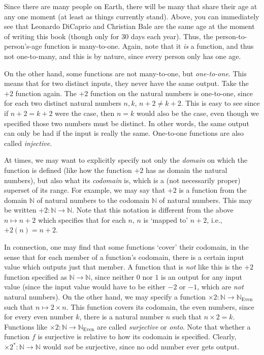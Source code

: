 Since there are many people on Earth, there will be many that share their age at any one moment (at least as things currently stand). Above, you can immediately see that Leonardo DiCaprio and Christian Bale are the same age at the moment of writing this book (though only for 30 days each year). Thus, the person-to-person's-age function is many-to-one. Again, note that it \textit{is} a function, and thus not one-to-many, and this is by nature, since every person only has one age.

On the other hand, some functions are not many-to-one, but \textit{one-to-one}. This means that for two distinct inputs, they never have the same output. Take the $+2$ function again. The $+2$ function on the natural numbers is one-to-one, since for each two distinct natural numbers $n, k$, $n+2\neq k+2$. This is easy to see since if $n+2=k+2$ were the case, then $n=k$ would also be the case, even though we specified those two numbers must be distinct. In other words, the same output can only be had if the input is really the same. One-to-one functions are also called \textit{injective}. 

At times, we may want to explicitly specify not only the \textit{domain} on which the function is defined (like how the function $+2$ has as domain the natural numbers), but also what its \textit{codomain} is, which is a (not necessarily proper) superset of its range. For example, we may say that $+2$ is a function from the domain $\mathbb{N}$ of natural numbers to the codomain $\mathbb{N}$ of natural numbers. This may be written $+2: \mathbb{N} \to \mathbb{N}$. Note that this notation is different from the above $n \mapsto n+2$ which specifies that for each $n$, $n$ is `mapped to' $n+2$, i.e., $+2(n)=n+2$. 

In connection, one may find that some functions `cover' their codomain, in the sense that for each member of a function's codomain, there is a certain input value which outputs just that member. A function that is \textit{not} like this is the $+2$ function specified as $\mathbb{N} \to \mathbb{N}$, since neither $0$ nor $1$ is an output for any input value (since the input value would have to be either $-2$ or $-1$, which are \textit{not} natural numbers). On the other hand, we may specify a function $\times2: \mathbb{N} \to \mathbb{N}_\text{Even}$ such that $n \mapsto 2\times n$. This function covers its codomain, the even numbers, since for every even number $k$, there is a natural number $n$ such that $n \times 2=k$. Functions like $\times 2: \mathbb{N} \to \mathbb{N}_\text{Even}$ are called \textit{surjective} or \textit{onto}. Note that whether a function $f$ is surjective is relative to how its codomain is specified. Clearly, $\times 2^*: \mathbb{N} \to \mathbb{N}$ would \textit{not} be surjective, since no odd number ever gets output. 

